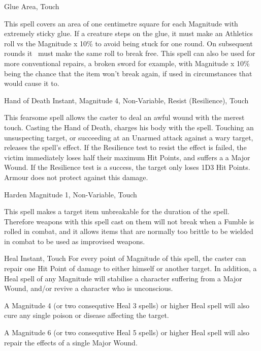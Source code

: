 \begin{rpg-spell}
{Glue}
{Area, Touch}

This spell covers an area of one centimetre square for each Magnitude with extremely sticky glue. If a creature steps on the glue, it must make an Athletics roll vs the Magnitude x 10\% to avoid being stuck for one round. On subsequent rounds it  must make the same roll to break free. This spell can also be used for more conventional repairs, a broken sword for example, with Magnitude x 10\% being the chance that the item won’t break again, if used in circumstances that would cause it to.
\end{rpg-spell}


\begin{rpg-spell}
{Hand of Death}
{Instant, Magnitude 4, Non-Variable, Resist (Resilience), Touch}

This fearsome spell allows the caster to deal an awful wound with the merest touch. Casting the Hand of Death, charges his body with the spell. Touching an unsuspecting target, or succeeding at an Unarmed attack against a wary target, releases the spell’s effect. If the Resilience test to resist the effect is failed, the victim immediately loses half their maximum Hit Points, and suffers a a Major Wound. If the Resilience test is a success, the target only loses 1D3 Hit Points. Armour does not protect against this damage.
\end{rpg-spell}


\begin{rpg-spell}
{Harden}
{Magnitude 1, Non-Variable, Touch}

This spell makes a target item unbreakable for the duration of the spell.  Therefore weapons with this spell cast on them will not break when a Fumble is rolled in combat, and it allows items that are normally too brittle to be wielded in combat to be used as improvised weapons.
\end{rpg-spell}


\begin{rpg-spell}
{Heal}
{Instant, Touch}
For every point of Magnitude of this spell, the caster can repair one Hit Point of damage to either himself or another target. In addition, a Heal spell of any Magnitude will stabilise a character suffering from a Major Wound, and/or revive a character who is unconscious. 

A Magnitude 4 (or two consequtive Heal 3 spells) or higher Heal spell will also cure any single poison or disease affecting the target. 

A Magnitude 6 (or two consequtive Heal 5 spells) or higher Heal spell will also repair the effects of a single Major Wound.
\end{rpg-spell}


